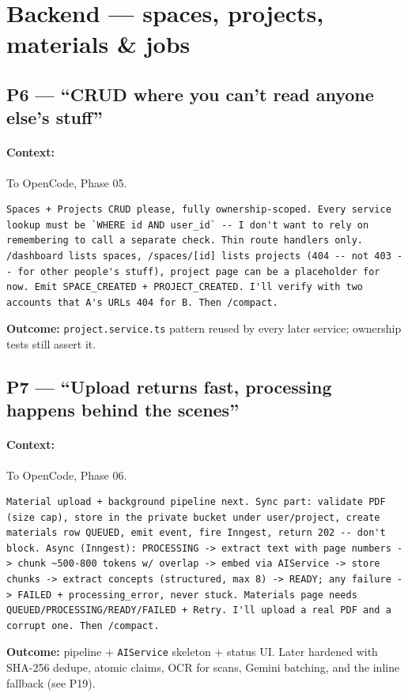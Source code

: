 \documentclass[11pt,a4paper]{article}
\begin{document}
\section{Backend --- spaces, projects, materials \& jobs}

\subsection{P6 --- ``CRUD where you can't read anyone else's stuff''}
\paragraph{Context:} To OpenCode, Phase 05.
\begin{lstlisting}
Spaces + Projects CRUD please, fully ownership-scoped. Every service lookup must be `WHERE id AND user_id` -- I don't want to rely on remembering to call a separate check. Thin route handlers only. /dashboard lists spaces, /spaces/[id] lists projects (404 -- not 403 -- for other people's stuff), project page can be a placeholder for now. Emit SPACE_CREATED + PROJECT_CREATED. I'll verify with two accounts that A's URLs 404 for B. Then /compact.
\end{lstlisting}
\textbf{Outcome:} \texttt{project.service.ts} pattern reused by every later service; ownership tests still assert it.

\subsection{P7 --- ``Upload returns fast, processing happens behind the scenes''}
\paragraph{Context:} To OpenCode, Phase 06.
\begin{lstlisting}
Material upload + background pipeline next. Sync part: validate PDF (size cap), store in the private bucket under user/project, create materials row QUEUED, emit event, fire Inngest, return 202 -- don't block. Async (Inngest): PROCESSING -> extract text with page numbers -> chunk ~500-800 tokens w/ overlap -> embed via AIService -> store chunks -> extract concepts (structured, max 8) -> READY; any failure -> FAILED + processing_error, never stuck. Materials page needs QUEUED/PROCESSING/READY/FAILED + Retry. I'll upload a real PDF and a corrupt one. Then /compact.
\end{lstlisting}
\textbf{Outcome:} pipeline + \texttt{AIService} skeleton + status UI. Later hardened with SHA-256 dedupe, atomic claims, OCR for scans, Gemini batching, and the inline fallback (see P19).
\end{document}

